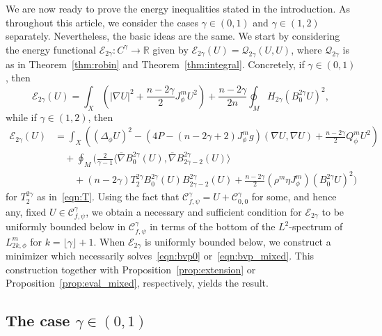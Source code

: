 \documentclass{amsart}
\theoremstyle{definition}
\theoremstyle{remark}
\numberwithin{equation}{section}
\begin{document}
We are now ready to prove the energy inequalities stated in the introduction.  As throughout this article, we consider the cases $\gamma\in(0,1)$ and $\gamma\in(1,2)$ separately.  Nevertheless, the basic ideas are the same.  We start by considering the energy functional ${\mathcal{E}}_{2\gamma}\colon C^\gamma\to{\mathbb{R}}$ given by ${\mathcal{E}}_{2\gamma}(U)={\mathcal{Q}}_{2\gamma}(U,U)$, where ${\mathcal{Q}}_{2\gamma}$ is as in Theorem~\ref{thm:robin} and Theorem~\ref{thm:integral}.  Concretely, if $\gamma\in(0,1)$, then
\begin{equation}
 \label{eqn:mE0}
 {\mathcal{E}}_{2\gamma}(U) = \int_X \left({\lvert}\nabla U{\rvert}^2 + \frac{n-2\gamma}{2}J_\phi^mU^2\right) + \frac{n-2\gamma}{2n}\oint_M H_{2\gamma}\left(B_{0}^{2\gamma}U\right)^2 ,
\end{equation}
while if $\gamma\in(1,2)$, then
\begin{equation}
 \label{eqn:mE1}
 \begin{split}
  {\mathcal{E}}_{2\gamma}(U) & = \int_X \left(\left(\Delta_\phi U\right)^2 - (4P-(n-2\gamma+2)J_\phi^mg)(\nabla U,\nabla U) + \frac{n-2\gamma}{2}Q_\phi^mU^2\right) \\
  & \quad + \oint_M \biggl(\frac{2}{\gamma-1}{\langle}{\overline{\nabla}} B_{0}^{2\gamma}(U),{\overline{\nabla}} B_{2\gamma-2}^{2\gamma}(U){\rangle} \\
  & \qquad + (n-2\gamma)T_{2}^{2\gamma}B_{0}^{2\gamma}(U)B_{2\gamma-2}^{2\gamma}(U) + \frac{n-2\gamma}{2}(\rho^m\eta J_\phi^m)\left(B_{0}^{2\gamma}U\right)^2\biggr)
 \end{split}
\end{equation}
for $T_{2}^{2\gamma}$ as in~\eqref{eqn:T}.  Using the fact that ${\mathcal{C}}_{f,\psi}^\gamma = U + {\mathcal{C}}_{0,0}^\gamma$ for some, and hence any, fixed $U\in{\mathcal{C}}_{f,\psi}^\gamma$, we obtain a necessary and sufficient condition for ${\mathcal{E}}_{2\gamma}$ to be uniformly bounded below in ${\mathcal{C}}_{f,\psi}^\gamma$ in terms of the bottom of the $L^2$-spectrum of $L_{2k,\phi}^m$ for $k=\lfloor\gamma\rfloor+1$.  When ${\mathcal{E}}_{2\gamma}$ is uniformly bounded below, we construct a minimizer which necessarily solves~\eqref{eqn:bvp0} or~\eqref{eqn:bvp_mixed}.  This construction together with Proposition~\ref{prop:extension} or Proposition~\ref{prop:eval_mixed}, respectively, yields the result.

\subsection{The case $\gamma\in(0,1)$}
\label{subsec:inequality/1}
\end{document}
